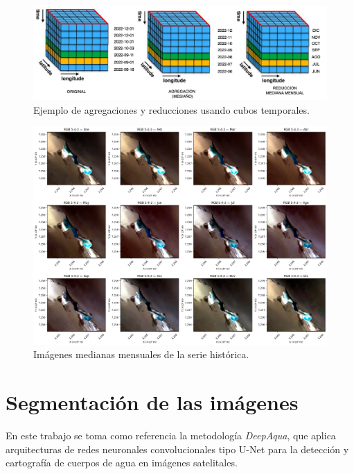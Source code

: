 \begin{figure}[ht]
        \centering
        \includegraphics[scale=.25]
        {Figures/cube.png}
        \caption{Ejemplo de agregaciones y reducciones usando cubos temporales.}
        \label{fig:img_mens}
\end{figure}


\begin{figure}[ht]
        \centering
        \includegraphics[scale=.30]
        {Figures/mensualimg_.png}
        \caption{Imágenes medianas mensuales de la serie histórica.}
        \label{fig:img_mens}
\end{figure}

\section{Segmentación de las imágenes}

En este trabajo se toma como referencia la metodología \emph{DeepAqua}\cite{DeepAqua2023}, que aplica arquitecturas de redes neuronales convolucionales tipo U-Net para la detección y cartografía de cuerpos de agua en imágenes satelitales. 

